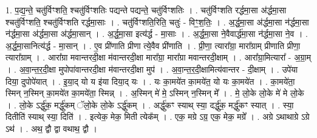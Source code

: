 \documentclass[17pt]{extarticle}
\begin{document}
1. प॒द्य॒न्ते॒ चतु॑र्विꣳशति॒ श्चतु॑र्विꣳशतिः पद्यन्ते पद्यन्ते॒ चतु॑र्विꣳशतिः । . चतु॑र्विꣳशति रर्द्धमा॒सा अ॑र्द्धमा॒सा श्चतु॑र्विꣳशति॒ श्चतु॑र्विꣳशति रर्द्धमा॒साः । . चतु॑र्विꣳशति॒रिति॒ चतुः॑ - विꣳ॒॒श॒तिः॒ । . अ॒र्द्ध॒मा॒सा अ॑र्द्धमा॒सा न॑र्द्धमा॒सा न॑र्द्धमा॒सा अ॑र्द्धमा॒सा अ॑र्द्धमा॒सान् । . अ॒र्द्ध॒मा॒सा इत्य॑र्द्ध - मा॒साः । . अ॒र्द्ध॒मा॒सा ने॒वैवार्द्ध॑मा॒सा न॑र्द्धमा॒सा ने॒व । . अ॒र्द्ध॒मा॒सानित्य॑र्द्ध - मा॒सान् । . ए॒व प्री॑णाति प्रीणा त्ये॒वैव प्री॑णाति । . प्री॒णा॒ त्यारा᳚ग्रा॒ मारा᳚ग्राम् प्रीणाति प्रीणा॒ त्यारा᳚ग्राम् । . आरा᳚ग्रा मवान्तरदी॒क्षा म॑वान्तरदी॒क्षा मारा᳚ग्रा॒ मारा᳚ग्रा मवान्तरदी॒क्षाम् । . आरा᳚ग्रा॒मित्यारा᳚ - अ॒ग्रा॒म् । . अ॒वा॒न्त॒र॒दी॒क्षा मुपोपा॑वान्तरदी॒क्षा म॑वान्तरदी॒क्षा मुप॑ । . अ॒वा॒न्त॒र॒दी॒क्षामित्य॑वान्तर - दी॒क्षाम् । . उपे॑या दिया॒ दुपोपे॑यात् । . इ॒या॒द् यो य इ॑या दिया॒द् यः । . यः का॒मये॑त का॒मये॑त॒ यो यः का॒मये॑त । . का॒मये॑ता॒ स्मिन् न॒स्मिन् का॒मये॑त का॒मये॑ता॒ स्मिन्न् । . अ॒स्मिन् मे॑ मे॒ ऽस्मिन् न॒स्मिन् मे᳚ । . मे॒ लो॒के लो॒के मे॑ मे लो॒के । . लो॒के ऽर्द्धु॑क॒ मर्द्धु॑कम् ॅलो॒के लो॒के ऽर्द्धु॑कम् । . अर्द्धु॑कꣳ स्याथ् स्या॒ दर्द्धु॑क॒ मर्द्धु॑कꣳ स्यात् । . स्या॒ दितीति॑ स्याथ् स्या॒ दिति॑ । . इत्येक॒ मेक॒ मिती त्येक᳚म् । . एक॒ मग्रे ऽग्र॒ एक॒ मेक॒ मग्रे᳚ । . अग्रे ऽथाथाग्रे ऽग्रे ऽथ॑ । . अथ॒ द्वौ द्वा वथाथ॒ द्वौ । \newline
\end{document}
